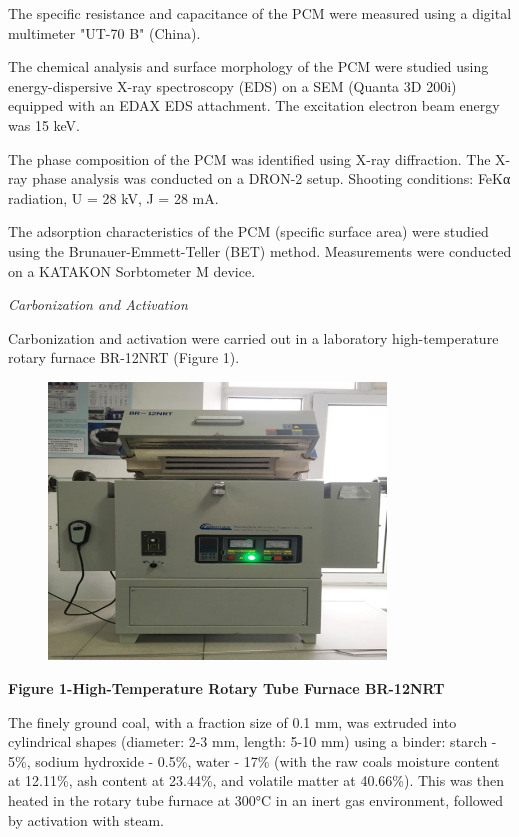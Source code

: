 The specific resistance and capacitance of the PCM were measured using a
digital multimeter "UT-70 B" (China).

The chemical analysis and surface morphology of the PCM were studied
using energy-dispersive X-ray spectroscopy (EDS) on a SEM (Quanta 3D
200i) equipped with an EDAX EDS attachment. The excitation electron beam
energy was 15 keV.

The phase composition of the PCM was identified using X-ray diffraction.
The X-ray phase analysis was conducted on a DRON-2 setup. Shooting
conditions: FeKα radiation, U = 28 kV, J = 28 mA.

The adsorption characteristics of the PCM (specific surface area) were
studied using the Brunauer-Emmett-Teller (BET) method. Measurements were
conducted on a KATAKON Sorbtometer M device.

\emph{Carbonization and Activation}

Carbonization and activation were carried out in a laboratory
high-temperature rotary furnace BR-12NRT (Figure 1).

\begin{figure}[H]
	\centering
	\includegraphics[width=0.8\textwidth]{assets/1066}
	\caption*{}
\end{figure}

\textbf{Figure 1-High-Temperature Rotary Tube Furnace BR-12NRT}

The finely ground coal, with a fraction size of 0.1 mm, was extruded
into cylindrical shapes (diameter: 2-3 mm, length: 5-10 mm) using a
binder: starch - 5\%, sodium hydroxide - 0.5\%, water - 17\% (with the
raw coal\textquotesingle s moisture content at 12.11\%, ash content at
23.44\%, and volatile matter at 40.66\%). This was then heated in the
rotary tube furnace at 300°C in an inert gas environment, followed by
activation with steam.

